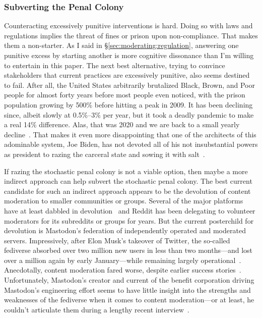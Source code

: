 \subsubsection{Subverting the Penal Colony}

Counteracting excessively punitive interventions is hard. Doing so with laws and
regulations implies the threat of fines or prison upon non-compliance. That
makes them a non-starter. As I said in \S\ref{sec:moderating:regulation},
answering one punitive excess by starting another is more cognitive dissonance
than I'm willing to entertain in this paper. The next best alternative, trying
to convince stakeholders that current practices are excessively punitive, also
seems destined to fail. After all, the United States arbitrarily brutalized
Black, Brown, and Poor people for almost forty years before most people even
noticed, with the prison population growing by 500\% before hitting a peak in
2009. It has been declining since, albeit slowly at 0.5\%--3\% per year, but it
took a deadly pandemic to make a real 14\% difference. Alas, that was 2020 and
we are back to a small yearly decline~\cite{Nellis2023}. That makes it even more
disappointing that one of the architects of this adominable system, Joe Biden,
has not devoted all of his not insubstantial powers as  president to razing
the carceral state and sowing it with
salt~\cite{Reinhart2022,StolbergHerndon2019}.

If razing the stochastic penal colony is not a viable option, then maybe a more
indirect approach can help subvert the stochastic penal colony. The best current
candidate for such an indirect approach appears to be the devolution of content
moderation to smaller communities or groups. Several of the major platforms have
at least dabbled in devolution~\cite{Goodman2021,Hern2021,Instagram2021} and
Reddit has been delegating to volunteer moderators for its subreddits or groups
for years. But the current posterchild for devolution is Mastodon's federation
of independently operated and moderated servers. Impressively, after Elon Musk's
takeover of Twitter, the so-called fediverse absorbed over two million new users
in less than two months---and lost over a million again by early January---while
remaining largely operational~\cite{Hoover2023,Peters2022}. Anecdotally, content
moderation fared worse, despite earlier success
stories~\cite{Cathcart2023,CopiaInstitute2021,Hall2023,Rozenshtein2022}.
Unfortunately, Mastodon's creator and current  of the benefit corporation
driving Mastodon's engineering effort seems to have little insight into the
strengths and weaknesses of the fediverse when it comes to content
moderation---or at least, he couldn't articulate them during a lengthy recent
interview~\cite{Patel2023}.

